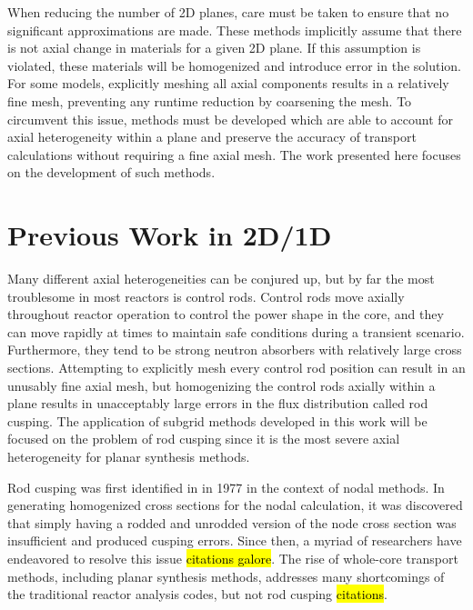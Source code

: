 When reducing the number of 2D planes, care must be taken to ensure that no significant approximations are made.  These methods implicitly assume that there is not axial change in materials for a given 2D plane.  If this assumption is violated, these materials will be homogenized and introduce error in the solution.  For some models, explicitly meshing all axial components results in a relatively fine mesh, preventing any runtime reduction by coarsening the mesh.  To circumvent this issue, methods must be developed which are able to account for axial heterogeneity within a plane and preserve the accuracy of transport calculations without requiring a fine axial mesh.  The work presented here focuses on the development of such methods.

\section{Previous Work in 2D/1D}

Many different axial heterogeneities can be conjured up, but by far the most troublesome in most reactors is control rods.  Control rods move axially throughout reactor operation to control the power shape in the core, and they can move rapidly at times to maintain safe conditions during a transient scenario.  Furthermore, they tend to be strong neutron absorbers with relatively large cross sections.  Attempting to explicitly mesh every control rod position can result in an unusably fine axial mesh, but homogenizing the control rods axially within a plane results in unacceptably large errors in the flux distribution called rod cusping.  The application of subgrid methods developed in this work will be focused on the problem of rod cusping since it is the most severe axial heterogeneity for planar synthesis methods.

Rod cusping was first identified in \cite{finnemann1977RodCuspingOrigMention} in 1977 in the context of nodal methods.  In generating homogenized cross sections for the nodal calculation, it was discovered that simply having a rodded and unrodded version of the node cross section was insufficient and produced cusping errors.  Since then, a myriad of researchers have endeavored to resolve this issue \hl{citations galore}.  The rise of whole-core transport methods, including planar synthesis methods, addresses many shortcomings of the traditional reactor analysis codes, but not rod cusping \hl{citations}.

